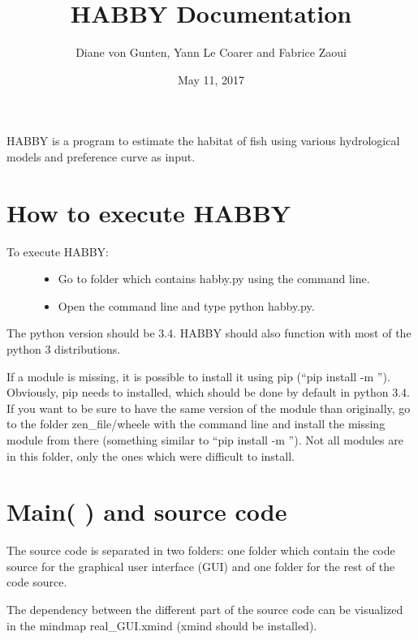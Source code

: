 \documentclass[letterpaper,10pt,english]{sphinxmanual}
\title{HABBY Documentation}
\date{May 11, 2017}
\author{Diane von Gunten, Yann Le Coarer and Fabrice Zaoui}
\begin{document}
\maketitle
\sphinxtableofcontents
{}\label{\detokenize{index::doc}}


HABBY is a program to estimate the habitat of fish using various hydrological models and preference curve as input.


\chapter{How to execute HABBY}
\label{\detokenize{index:how-to-execute-habby}}\label{\detokenize{index:welcome-to-habby-s-documentation}}\begin{description}
\item[{To execute HABBY:}] \leavevmode\begin{itemize}
\item {} 
Go to folder which contains habby.py using the command line.

\item {} 
Open the command line and type python habby.py.

\end{itemize}

\end{description}

The python version should be 3.4. HABBY should also function with most of the python 3 distributions.

If a module is missing, it is possible to install it using pip (``pip install -m ''). Obviously, pip needs to installed, which should be done by default in python 3.4. If you want to be sure to have the same version of the module than originally, go to the folder zen\_file/wheele with the command line and install the missing module from there (something similar to ``pip install -m ''). Not all modules are in this folder, only the ones which were difficult to install.


\chapter{Main(   ) and source code}
\label{\detokenize{index:main-and-source-code}}
The source code is separated in two folders: one folder which contain the code source for the graphical user interface (GUI) and one folder for the rest of the code source.

The dependency between the different part of the source code can be visualized in the mindmap real\_GUI.xmind (xmind should be installed).
\end{document}
